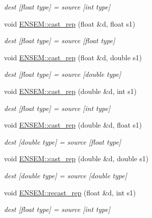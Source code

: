 \begin{DoxyCompactItemize}
\begin{DoxyCompactList}\small\item\em dest \mbox{[}float type\mbox{]} = source \mbox{[}int type\mbox{]} \end{DoxyCompactList}\item 
void \mbox{\hyperlink{group__simpleword_gaa6817877d8caa75bb821988eb6f9bdb8}{E\+N\+S\+E\+M\+::cast\+\_\+rep}} (float \&d, float s1)
\begin{DoxyCompactList}\small\item\em dest \mbox{[}float type\mbox{]} = source \mbox{[}float type\mbox{]} \end{DoxyCompactList}\item 
void \mbox{\hyperlink{group__simpleword_gab0dd44662b2ec54866199a048cae439c}{E\+N\+S\+E\+M\+::cast\+\_\+rep}} (float \&d, double s1)
\begin{DoxyCompactList}\small\item\em dest \mbox{[}float type\mbox{]} = source \mbox{[}double type\mbox{]} \end{DoxyCompactList}\item 
void \mbox{\hyperlink{group__simpleword_gaeaf6ee66ca8c7e396f7b749088ac2992}{E\+N\+S\+E\+M\+::cast\+\_\+rep}} (double \&d, int s1)
\begin{DoxyCompactList}\small\item\em dest \mbox{[}float type\mbox{]} = source \mbox{[}int type\mbox{]} \end{DoxyCompactList}\item 
void \mbox{\hyperlink{group__simpleword_ga1d89d98529059fc73be75dce981e001d}{E\+N\+S\+E\+M\+::cast\+\_\+rep}} (double \&d, float s1)
\begin{DoxyCompactList}\small\item\em dest \mbox{[}double type\mbox{]} = source \mbox{[}float type\mbox{]} \end{DoxyCompactList}\item 
void \mbox{\hyperlink{group__simpleword_ga8cac7966a593620ed6aa821a74ebe0fd}{E\+N\+S\+E\+M\+::cast\+\_\+rep}} (double \&d, double s1)
\begin{DoxyCompactList}\small\item\em dest \mbox{[}double type\mbox{]} = source \mbox{[}double type\mbox{]} \end{DoxyCompactList}\item 
void \mbox{\hyperlink{group__simpleword_ga1b85638c2b2617f517f0d68dd5fd3a69}{E\+N\+S\+E\+M\+::recast\+\_\+rep}} (float \&d, int s1)
\begin{DoxyCompactList}\small\item\em dest \mbox{[}float type\mbox{]} = source \mbox{[}int type\mbox{]} \end{DoxyCompactList}\item 

\end{DoxyCompactItemize}
